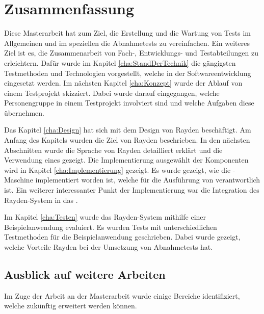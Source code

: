 \chapter{Zusammenfassung}
\label{cha:Zusammenfassung}

Diese Masterarbeit hat zum Ziel, die Erstellung und die Wartung von Tests im Allgemeinen und im speziellen die Abnahmetests zu vereinfachen. Ein weiteres Ziel ist es, die Zusammenarbeit von Fach-, Entwicklungs- und Testabteilungen zu erleichtern. Dafür wurde im Kapitel \ref{cha:StandDerTechnik} die gängigsten Testmethoden und Technologien vorgestellt, welche in der Softwareentwicklung eingesetzt werden. Im nächsten Kapitel \ref{cha:Konzept} wurde der Ablauf von einem Testprojekt skizziert. Dabei wurde darauf eingegangen, welche Personengruppe in einem Testprojekt involviert sind und welche Aufgaben diese übernehmen. 

\SuperPar
Das Kapitel \ref{cha:Design} hat sich mit dem Design von Rayden beschäftigt. Am Anfang des Kapitels wurden die Ziel von Rayden beschrieben. In den nächsten Abschnitten wurde die Sprache von Rayden detailliert erklärt und die Verwendung eines  gezeigt. Die Implementierung ausgewählt der Komponenten wird in Kapitel \ref{cha:Implementierung} gezeigt. Es wurde gezeigt, wie die -Maschine implementiert worden ist, welche für die Ausführung von  verantwortlich ist. Ein weiterer interessanter Punkt der Implementierung war die Integration des Rayden-System in das . 

\SuperPar
Im Kapitel \ref{cha:Testen} wurde das Rayden-System mithilfe einer Beispielanwendung evaluiert. Es wurden Tests mit unterschiedlichen Testmethoden für die Beispielanwendung geschrieben. Dabei wurde gezeigt, welche Vorteile Rayden bei der Umsetzung von Abnahmetests hat.

\section{Ausblick auf weitere Arbeiten}

Im Zuge der Arbeit an der Masterarbeit wurde einige Bereiche identifiziert, welche zukünftig erweitert werden können.\\

